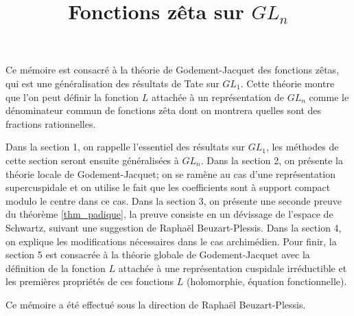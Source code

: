 \documentclass{amsart}
\begin{document}
\title{Fonctions zêta sur $GL_n$}
\maketitle

Ce mémoire est consacré à la théorie de Godement-Jacquet \cite{godement-jacquet} des fonctions zêtas, qui est une généralisation des résultats de Tate \cite{tate} sur $GL_1$. Cette théorie montre que l'on peut définir la fonction $L$ attachée à un représentation de $GL_n$ comme le dénominateur commun de fonctions zêta dont on montrera quelles sont des fractions rationnelles.

Dans la section 1, on rappelle l'essentiel des résultats sur $GL_1$, les méthodes de cette section seront ensuite généralisées à $GL_n$. Dans la section 2, on présente la théorie locale de Godement-Jacquet; on se ramène au cas d'une représentation supercuspidale et on utilise le fait que les coefficients sont à support compact modulo le centre dans ce cas. Dans la section 3, on présente une seconde preuve du théorème \ref{thm_padique}, la preuve consiste en un dévissage de l'espace de Schwartz, suivant une suggestion de Raphaël Beuzart-Plessis. Dans la section 4, on explique les modifications nécessaires dans le cas archimédien. Pour finir, la section 5 est consacrée à la théorie globale de Godement-Jacquet avec la définition de la fonction $L$ attachée à une représentation cuspidale irréductible et les premières propriétés de ces fonctions $L$ (holomorphie, équation fonctionnelle).

Ce mémoire a été effectué sous la direction de Raphaël Beuzart-Plessis.

\tableofcontents











 
\end{document}
